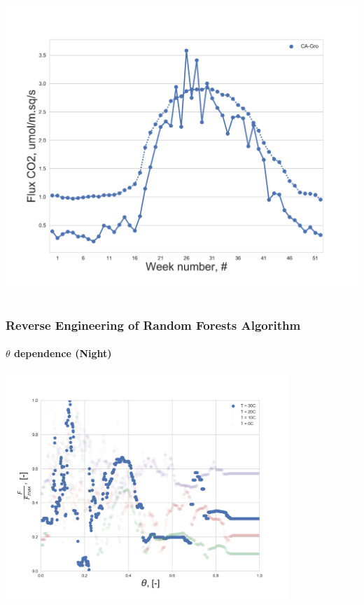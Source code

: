 \documentclass{beamer}
\begin{document}
\begin{frame}
\begin{columns}[t]
\includegraphics[width=\textwidth]{Reverse_engin_only_T/0.png}
\end{columns}

\end{frame}




\begin{frame}
\frametitle{Reverse Engineering of Random Forests Algorithm}
\framesubtitle{$\theta$ dependence (Night)}

\centering
\includegraphics[width=0.8\textwidth]{Theta_dependence_30.png}

\end{frame}
\end{document}
